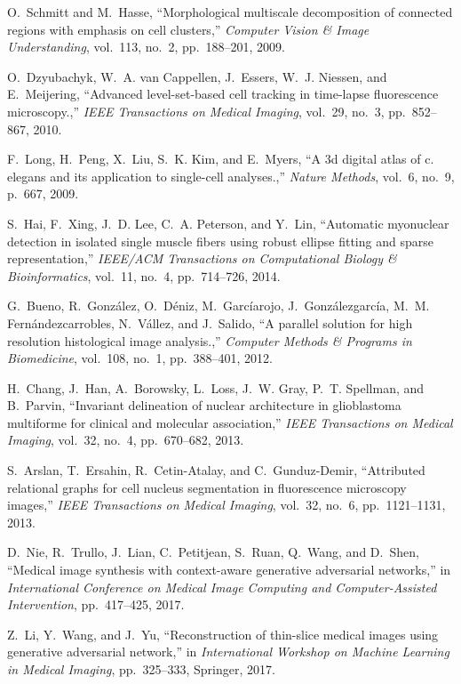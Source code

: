 \documentclass[journal]{IEEEtran}
\begin{document}
\begin{thebibliography}{10}
O.~Schmitt and M.~Hasse, ``Morphological multiscale decomposition of connected
  regions with emphasis on cell clusters,'' {\em Computer Vision \& Image
  Understanding}, vol.~113, no.~2, pp.~188--201, 2009.

O.~Dzyubachyk, W.~A. van Cappellen, J.~Essers, W.~J. Niessen, and E.~Meijering,
  ``Advanced level-set-based cell tracking in time-lapse fluorescence
  microscopy.,'' {\em IEEE Transactions on Medical Imaging}, vol.~29, no.~3,
  pp.~852--867, 2010.

F.~Long, H.~Peng, X.~Liu, S.~K. Kim, and E.~Myers, ``A 3d digital atlas of c.
  elegans and its application to single-cell analyses.,'' {\em Nature Methods},
  vol.~6, no.~9, p.~667, 2009.

S.~Hai, F.~Xing, J.~D. Lee, C.~A. Peterson, and Y.~Lin, ``Automatic myonuclear
  detection in isolated single muscle fibers using robust ellipse fitting and
  sparse representation,'' {\em IEEE/ACM Transactions on Computational Biology
  \& Bioinformatics}, vol.~11, no.~4, pp.~714--726, 2014.

G.~Bueno, R.~González, O.~Déniz, M.~Garcíarojo, J.~Gonzálezgarcía, M.~M.
  Fernándezcarrobles, N.~Vállez, and J.~Salido, ``A parallel solution for
  high resolution histological image analysis.,'' {\em Computer Methods \&
  Programs in Biomedicine}, vol.~108, no.~1, pp.~388--401, 2012.

H.~Chang, J.~Han, A.~Borowsky, L.~Loss, J.~W. Gray, P.~T. Spellman, and
  B.~Parvin, ``Invariant delineation of nuclear architecture in glioblastoma
  multiforme for clinical and molecular association,'' {\em IEEE Transactions
  on Medical Imaging}, vol.~32, no.~4, pp.~670--682, 2013.

S.~Arslan, T.~Ersahin, R.~Cetin-Atalay, and C.~Gunduz-Demir, ``Attributed
  relational graphs for cell nucleus segmentation in fluorescence microscopy
  images,'' {\em IEEE Transactions on Medical Imaging}, vol.~32, no.~6,
  pp.~1121--1131, 2013.

D.~Nie, R.~Trullo, J.~Lian, C.~Petitjean, S.~Ruan, Q.~Wang, and D.~Shen,
  ``Medical image synthesis with context-aware generative adversarial
  networks,'' in {\em International Conference on Medical Image Computing and
  Computer-Assisted Intervention}, pp.~417--425, 2017.

Z.~Li, Y.~Wang, and J.~Yu, ``Reconstruction of thin-slice medical images using
  generative adversarial network,'' in {\em International Workshop on Machine
  Learning in Medical Imaging}, pp.~325--333, Springer, 2017.


\end{thebibliography}
\end{document}
